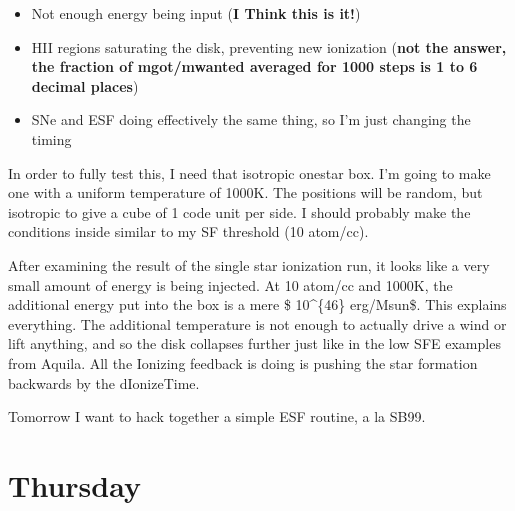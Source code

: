 \documentclass[11pt,letterpaper]{article}
\begin{document}
\begin{itemize}
\item
  Not enough energy being input (\textbf{I Think this is it!})
\item
  HII regions saturating the disk, preventing new ionization
  (\textbf{not the answer, the fraction of mgot/mwanted averaged for
  1000 steps is 1 to 6 decimal places})
\item
  SNe and ESF doing effectively the same thing, so I'm just changing the
  timing
\end{itemize}

In order to fully test this, I need that isotropic onestar box. I'm
going to make one with a uniform temperature of 1000K. The positions
will be random, but isotropic to give a cube of 1 code unit per side. I
should probably make the conditions inside similar to my SF threshold
(10 atom/cc).

After examining the result of the single star ionization run, it looks
like a very small amount of energy is being injected. At 10 atom/cc and
1000K, the additional energy put into the box is a mere \$ 10\^{}\{46\}
erg/Msun\$. This explains everything. The additional temperature is not
enough to actually drive a wind or lift anything, and so the disk
collapses further just like in the low SFE examples from Aquila. All the
Ionizing feedback is doing is pushing the star formation backwards by
the dIonizeTime.

Tomorrow I want to hack together a simple ESF routine, a la SB99.

\section{Thursday}
\end{document}
